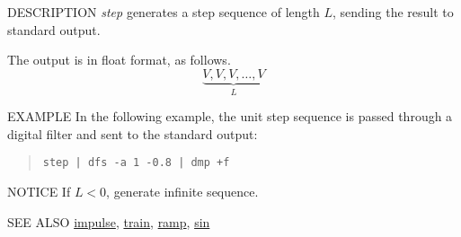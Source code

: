 \begin{synopsis}
\item[step] [ --l $L$ ] [ --n $N$ ] [ --v $V$ ]
\end{synopsis}

\begin{qsection}{DESCRIPTION}
{\em step} generates a step sequence of length $L$, 
sending the result to standard output.

The output is in float format, as follows.
\begin{displaymath}
\underbrace{V, V, V, \dots, V}_{L}
\end{displaymath}
\end{qsection}

\begin{options}
\end{options}

\begin{qsection}{EXAMPLE}
In the following example, the unit step sequence is passed through
a digital filter and sent to the standard output:
\begin{quote}
\verb!step | dfs -a 1 -0.8 | dmp +f!
\end{quote}
\end{qsection}

\begin{qsection}{NOTICE}
If $L<0$, generate infinite sequence.
\end{qsection}

\begin{qsection}{SEE ALSO}
\hyperlink{impulse}{impulse},
\hyperlink{train}{train},
\hyperlink{ramp}{ramp},
\hyperlink{sin}{sin}
\end{qsection}
